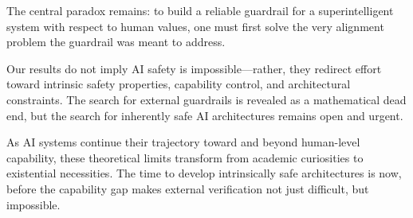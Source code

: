 \documentclass[11pt]{article}
\begin{document}
The central paradox remains: to build a reliable guardrail for a superintelligent system with respect to human values, one must first solve the very alignment problem the guardrail was meant to address.

Our results do not imply AI safety is impossible—rather, they redirect effort toward intrinsic safety properties, capability control, and architectural constraints. The search for external guardrails is revealed as a mathematical dead end, but the search for inherently safe AI architectures remains open and urgent.

As AI systems continue their trajectory toward and beyond human-level capability, these theoretical limits transform from academic curiosities to existential necessities. The time to develop intrinsically safe architectures is now, before the capability gap makes external verification not just difficult, but impossible.
\end{document}
